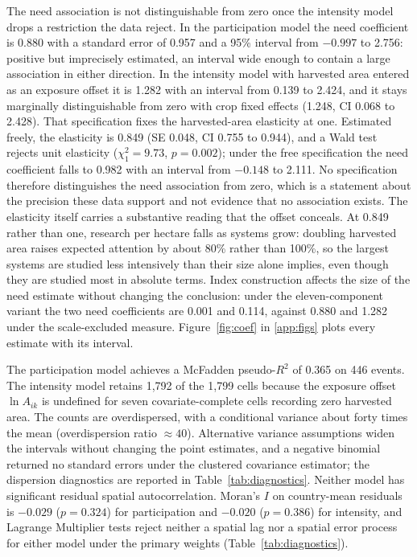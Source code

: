 \documentclass[ASNA,twocolumn]{USG}
\begin{document}
The need association is not distinguishable from zero once the intensity model drops a
restriction the data reject. In the participation model the need coefficient is 0.880 with a standard error of 0.957 and a 95\%
interval from $-0.997$ to 2.756: positive but imprecisely estimated, an interval wide enough to
contain a large association in either direction. In the intensity model with harvested area entered
as an exposure offset it is 1.282 with an interval from 0.139 to 2.424, and it stays marginally
distinguishable from zero with crop fixed effects (1.248, CI 0.068 to 2.428). That specification
fixes the harvested-area elasticity at one. Estimated freely, the elasticity is 0.849 (SE 0.048, CI
0.755 to 0.944), and a Wald test rejects unit elasticity ($\chi^{2}_{1} = 9.73$, $p = 0.002$);
under the free specification the need coefficient falls to 0.982 with an interval from $-0.148$ to
2.111. No specification therefore
distinguishes the need association from zero, which is a statement about the precision these data
support and not evidence that no association exists. The elasticity itself carries a substantive
reading that the offset conceals. At 0.849 rather than one, research per hectare falls as systems
grow: doubling harvested area raises expected attention by about 80\% rather than 100\%, so the
largest systems are studied less intensively than their size alone implies, even though they are
studied most in absolute terms. Index construction affects the size of the need estimate without
changing the conclusion: under the eleven-component variant the two need coefficients are 0.001 and 0.114, against 0.880 and
1.282 under the scale-excluded measure.
Figure~\ref{fig:coef} in \ref{app:figs} plots every estimate with its interval.

The participation model achieves a McFadden pseudo-$R^{2}$ of 0.365 on 446 events. The
intensity model retains 1,792 of the 1,799 cells because the exposure offset $\ln A_{ik}$ is
undefined for seven covariate-complete cells recording zero harvested area. The counts are overdispersed, with a conditional variance about forty times the mean
(overdispersion ratio $\approx 40$). Alternative variance assumptions widen the intervals without
changing the point estimates, and a negative binomial returned no standard errors under the
clustered covariance estimator; the dispersion diagnostics are reported in
Table~\ref{tab:diagnostics}. Neither model has significant residual spatial autocorrelation. Moran's $I$ on country-mean
residuals is $-0.029$ ($p = 0.324$) for participation and $-0.020$ ($p = 0.386$) for intensity,
and Lagrange Multiplier tests reject neither a spatial lag nor a spatial error process for either
model under the primary weights (Table~\ref{tab:diagnostics}).
\end{document}
